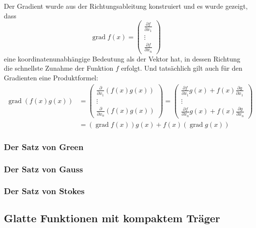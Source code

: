 Der Gradient wurde aus der Richtungsableitung konstruiert und es wurde
gezeigt, dass 
\[
\operatorname{grad} f(x)
=
\begin{pmatrix}
\frac{\partial f}{\partial x_1}\\
\vdots\\
\frac{\partial f}{\partial x_n}
\end{pmatrix}
\]
eine koordinatenunabhängige Bedeutung als der Vektor hat, in dessen
Richtung die schnellste Zunahme der Funktion $f$ erfolgt.
Und tatsächlich gilt auch für den Gradienten eine Produktformel:
\begin{align*}
\operatorname{grad}(f(x)g(x))
&=
\begin{pmatrix}
\frac{\partial}{\partial x_1}(f(x)g(x))\\
\vdots\\
\frac{\partial}{\partial x_n}(f(x)g(x))
\end{pmatrix}
=
\begin{pmatrix}
\frac{\partial f}{\partial x_1} g(x)
+
f(x) \frac{\partial g}{\partial x_1}\\
\vdots\\
\frac{\partial f}{\partial x_n} g(x)
+
f(x) \frac{\partial g}{\partial x_n}
\end{pmatrix}
\\
&=
(\operatorname{grad}f(x)) g(x)
+
f(x)(\operatorname{grad}g(x))
\end{align*}

%
%
\subsubsection{Der Satz von Green}

%
%
\subsubsection{Der Satz von Gauss}

%
%
\subsubsection{Der Satz von Stokes}

%
%
\subsection{Glatte Funktionen mit kompaktem Träger}

%
%
